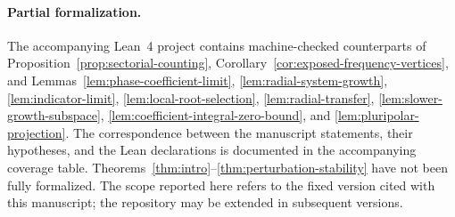\paragraph{Partial formalization.}
The accompanying Lean~4 project contains machine-checked counterparts of
Proposition~\ref{prop:sectorial-counting},
Corollary~\ref{cor:exposed-frequency-vertices}, and
Lemmas~\ref{lem:phase-coefficient-limit},
\ref{lem:radial-system-growth},
\ref{lem:indicator-limit},
\ref{lem:local-root-selection},
\ref{lem:radial-transfer},
\ref{lem:slower-growth-subspace},
\ref{lem:coefficient-integral-zero-bound}, and
\ref{lem:pluripolar-projection}.
The correspondence between the manuscript statements, their hypotheses,
and the Lean declarations is documented in the accompanying coverage table.
Theorems~\ref{thm:intro}--\ref{thm:perturbation-stability}
have not been fully formalized.
The scope reported here refers to the fixed version cited with this manuscript;
the repository may be extended in subsequent versions.
